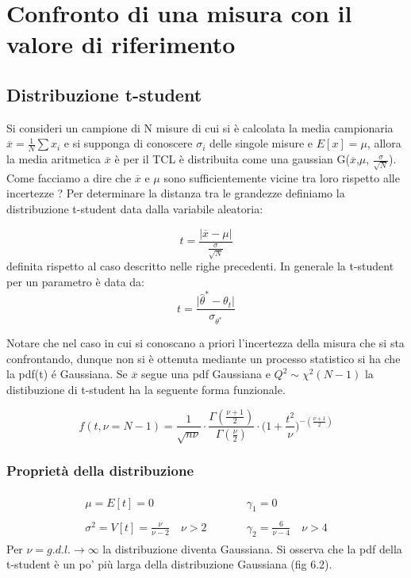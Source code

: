  \section{Confronto di una misura con il valore di riferimento}
 
 \subsection{Distribuzione t-student}
 Si consideri un campione di N misure di cui si \`{e} calcolata la media campionaria $\overline{x} = \frac{1}{N} \sum x_i$ e si supponga di conoscere $\sigma_i$ delle singole misure e $E[x] = \mu$, allora la media aritmetica $\overline{x}$ \`{e} per il TCL \`{e} distribuita come una gaussian G($\overline{x}$,$\mu$, $\frac{\sigma}{\sqrt{N}}$). Come facciamo a dire che $\overline{x}$ e ${\mu}$ sono sufficientemente vicine tra loro rispetto alle incertezze ?
 \newline
 Per determinare la distanza tra le grandezze definiamo la distribuzione t-student data dalla variabile aleatoria:
 
 \begin{equation*}
 	t = \dfrac{\vert \overline{x} - \mu\vert }{\frac{\sigma}{\sqrt{N}}}
 \end{equation*}
 definita rispetto al caso descritto nelle righe precedenti. In generale la t-student per un parametro \`{e} data da:
 \begin{equation}
 	t = \dfrac{\vert \hat{\theta}^* - \theta_t \vert}{\sigma_{\theta^*}}
 \end{equation}
 
 Notare che nel caso in cui si conoscano a priori l'incertezza della misura che si sta confrontando, dunque non si \`{e} ottenuta mediante un processo statistico si ha che la pdf(t) \'{e} Gaussiana.
 Se $\overline{x}$ segue una pdf Gaussiana e $Q^2 \sim \chi^2(N-1)$ la distibuzione di t-student ha la seguente forma funzionale.
 
 \begin{equation}
 	f(t,\nu = N-1) = \dfrac{1}{\sqrt{n\nu}} \cdot \dfrac{\Gamma({\frac{\nu+1}{2}})}{\Gamma(\frac{\nu}{2})} \cdot \Big (1 + \frac{t^2}{\nu} \Big) ^{-(\frac{\nu+1}{2})}
 \end{equation}
 
 \subsubsection{Propriet\`{a} della distribuzione}
 \begin{align*}
 	\begin{matrix}
 		\mu = E[t] = 0 & \quad \quad & \gamma_1 = 0 \\
 		\\
 		\sigma^2 = V[t] = \frac{\nu}{\nu-2} \quad \nu > 2 & \quad \quad & \gamma_2 = \frac{6}{\nu-4} \quad \nu > 4
 	\end{matrix}	
 \end{align*}
 \newline
 Per $\nu = g.d.l. \rightarrow \infty$ la distribuzione diventa Gaussiana. Si osserva che la pdf della t-student \`{e} un po' pi\`{u} larga della distribuzione Gaussiana (fig 6.2).
 
